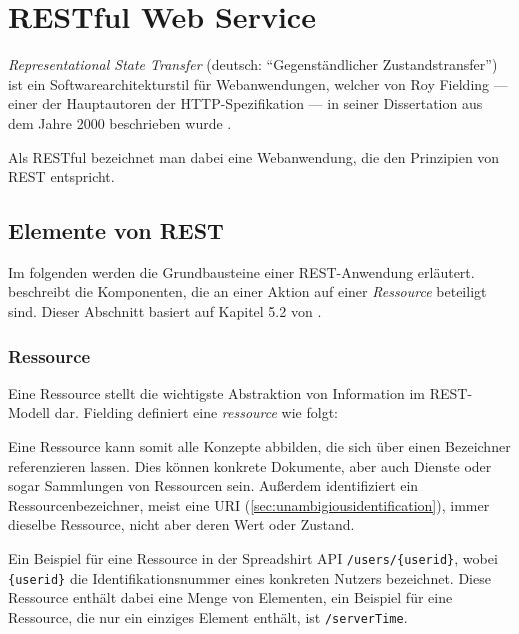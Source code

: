 \section{RESTful Web Service}
\label{sec:rest}

\emph{Representational State Transfer} (deutsch: \enquote{Gegenständlicher Zustandstransfer}) ist ein Softwarearchitekturstil für Webanwendungen, welcher von Roy Fielding --- einer der Hauptautoren der \gls{HTTP}-Spezifikation --- in seiner Dissertation aus dem Jahre 2000  beschrieben wurde \cite[Kapitel 5][95 ff.]{fieldingDissertation}. 

Als \gls{RESTful} bezeichnet man dabei eine Webanwendung, die den Prinzipien von \gls{REST} entspricht. 

\subsection{Elemente von REST}

Im folgenden werden die Grundbausteine einer \gls{REST}-Anwendung erläutert.  beschreibt die Komponenten, die an einer Aktion auf einer \emph{Ressource} beteiligt sind. Dieser Abschnitt basiert auf Kapitel 5.2 von \cite[][S. 86 ff.]{fieldingDissertation}.

\subsubsection{Ressource}

Eine Ressource stellt die wichtigste Abstraktion von Information im \gls{REST}-Modell dar. Fielding definiert eine \emph{ressource} wie folgt:


Eine Ressource kann somit alle Konzepte abbilden, die sich über einen Bezeichner referenzieren lassen. Dies können konkrete Dokumente, aber auch Dienste oder sogar Sammlungen von Ressourcen sein.
Außerdem identifiziert ein Ressourcenbezeichner, meist eine \gls{URI} (\cref{sec:unambigiousidentification}), immer dieselbe Ressource, nicht aber deren Wert oder Zustand.

Ein Beispiel für eine Ressource in der Spreadshirt \gls{API} \texttt{/users/\{userid\}}, wobei \texttt{\{userid\}} die Identifikationsnummer eines konkreten Nutzers bezeichnet. Diese Ressource enthält dabei eine Menge von Elementen, ein Beispiel für eine Ressource, die nur ein einziges Element enthält, ist \texttt{/serverTime}. 

